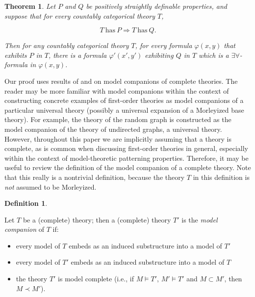 \documentclass{article}
\newtheorem{theorem}{Theorem}
\theoremstyle{definition}
\newtheorem{definition}{Definition}
\theoremstyle{definition}
\theoremstyle{definition}
\begin{document}
\begin{theorem} \label{theorem on implications between positively straightly definable properties in countably categorical theories}
    Let $P$ and $Q$ be positively straightly definable properties, and suppose that for every countably categorical theory $T$,

    $$T \mathrm{\: has \:} P \Rightarrow T \mathrm{\: has \:} Q.$$


    Then for any countably categorical theory $T$, for every formula $\varphi(x, y)$ that exhibits $P$ in $T$, there is a formula $\varphi'(x', y')$ exhibiting $Q$ in $T$ which is a $\exists\forall$-formula in $\varphi(x, y)$.


    
\end{theorem}


Our proof uses results of \cite{bodirsky2025taking} and \cite{saracino1973model} on model companions of complete theories. The reader may be more familiar with model companions within the context of constructing concrete examples of first-order theories as model companions of a particular universal theory (possibly a universal expansion of a Morleyized base theory). For example, the theory of the random graph is constructed as the model companion of the theory of undirected graphs, a universal theory. However, throughout this paper we are implicitly assuming that a theory is complete, as is common when discussing first-order theories in general, especially within the context of model-theoretic patterning properties. Therefore, it may be useful to review the definition of the model companion of a complete theory. Note that this really is a nontrivial definition, because the theory $T$ in this definition is \textit{not} assumed to be Morleyized. 

\begin{definition}
\label{model companion of a complete theory}


Let $T$ be a (complete) theory; then a (complete) theory $T'$ is the \textit{model companion} of $T$ if:

\begin{itemize}
    \item every model of $T$ embeds as an induced substructure into a model of $T'$
    \item every model of $T'$ embeds as an induced substructure into a model of $T$
    \item the theory $T'$ is model complete (i.e., if $M \models T'$, $M' \models T'$ and $M \subset M'$, then $M \prec M'$).
\end{itemize}




\end{definition}
\end{document}

